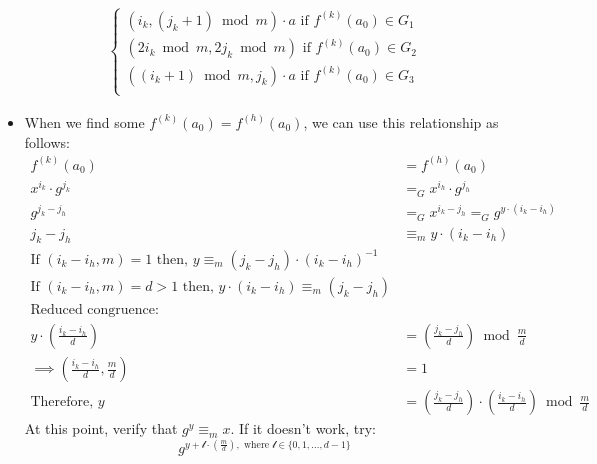 \begin{itemize}
\begin{align*}
\begin{cases}
            (i_{k}, (j_{k} + 1) \bmod m) \cdot a \text{ if } f^{(k)}(a_0) \in G_1 \\
            (2i_{k} \bmod m, 2j_{k} \bmod m) \text{ if } f^{(k)}(a_0) \in G_2 \\
            ((i_{k} + 1) \bmod m, j_{k}) \cdot a \text{ if } f^{(k)}(a_0) \in G_3 \\
        \end{cases}
    \end{align*}
    \item When we find some $f^{(k)}(a_0) = f^{(h)}(a_0)$, we can use this relationship as follows:
    \begin{align*}
        f^{(k)}(a_0) &= f^{(h)}(a_0)\\
        x^{i_k} \cdot g^{j_k} &=_G x^{i_h} \cdot g^{j_h}\\
        g^{j_k - j_h} &=_G x^{i_k - j_h} =_G g^{y \cdot (i_k - i_h)}\\
        j_k - j_h &\equiv_{m} y \cdot (i_k - i_h)\\
        \text{If } (i_k - i_h, m) = 1 \text{ then, } y \equiv_{m} (j_k - j_h) \cdot (i_k - i_h)^{-1}\\
        \text{If } (i_k - i_h, m) = d > 1 \text{ then, } y \cdot (i_k - i_h) \equiv_{m} (j_k - j_h)\\
        \text{Reduced congruence:}\\
        y \cdot (\frac{i_k - i_h}{d}) &= (\frac{j_k - j_h}{d}) \bmod \frac{m}{d}\\
        \implies (\frac{i_k - i_h}{d}, \frac{m}{d}) &= 1\\
        \text{Therefore, } y &= (\frac{j_k - j_h}{d}) \cdot (\frac{i_k - i_h}{d}) \bmod \frac{m}{d}
    \end{align*}
    At this point, verify that $g^y \equiv_m x$. If it doesn't work, try:
    \[g^{y + \mathcal{l} \cdot (\frac{m}{d}), \text{ where } \mathcal{l} \in \{0, 1, \dots, d - 1\}}\]
\end{itemize}

